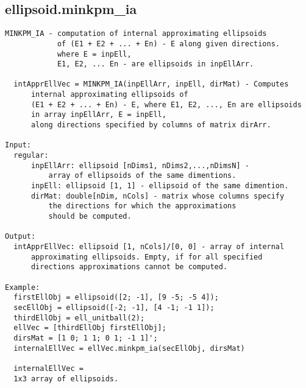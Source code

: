 \subsection{\texorpdfstring{ellipsoid.minkpm\_ia}{minkpm\_ia}}\label{method:ellipsoid.minkpmia}
\begin{verbatim}
MINKPM_IA - computation of internal approximating ellipsoids
            of (E1 + E2 + ... + En) - E along given directions.
            where E = inpEll,
            E1, E2, ... En - are ellipsoids in inpEllArr.

  intApprEllVec = MINKPM_IA(inpEllArr, inpEll, dirMat) - Computes
      internal approximating ellipsoids of
      (E1 + E2 + ... + En) - E, where E1, E2, ..., En are ellipsoids
      in array inpEllArr, E = inpEll,
      along directions specified by columns of matrix dirArr.

Input:
  regular:
      inpEllArr: ellipsoid [nDims1, nDims2,...,nDimsN] -
          array of ellipsoids of the same dimentions.
      inpEll: ellipsoid [1, 1] - ellipsoid of the same dimention.
      dirMat: double[nDim, nCols] - matrix whose columns specify
          the directions for which the approximations
          should be computed.

Output:
  intApprEllVec: ellipsoid [1, nCols]/[0, 0] - array of internal
      approximating ellipsoids. Empty, if for all specified
      directions approximations cannot be computed.

Example:
  firstEllObj = ellipsoid([2; -1], [9 -5; -5 4]);
  secEllObj = ellipsoid([-2; -1], [4 -1; -1 1]);
  thirdEllObj = ell_unitball(2);
  ellVec = [thirdEllObj firstEllObj];
  dirsMat = [1 0; 1 1; 0 1; -1 1]';
  internalEllVec = ellVec.minkpm_ia(secEllObj, dirsMat)

  internalEllVec =
  1x3 array of ellipsoids.
\end{verbatim}
